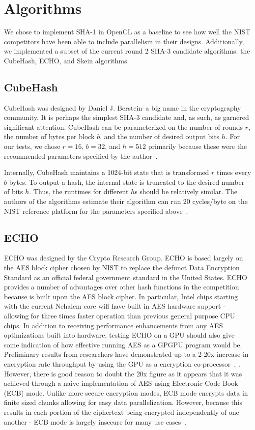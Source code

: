 \section*{Algorithms}
We chose to implement SHA-1 in OpenCL as a baseline to see how well the NIST competitors have been able to include parallelism in their designs.
Additionally, we implemented a subset of the current round 2 SHA-3 candidate algorithms: the CubeHash, ECHO, and Skein algorithms.

\subsection*{CubeHash}

CubeHash was designed by Daniel J. Berstein--a big name in the cryptography community.
It is perhaps the simplest SHA-3 candidate and, as such, as garnered significant attention.
CubeHash can be parameterized on the number of rounds $r$, the number of bytes per block $b$, and the number of desired output bits $h$.
For our tests, we chose $r=16$, $b=32$, and $h=512$ primarily because these were the recommended parameters specified by the author~\cite{CubeHash-spec}.

Internally, CubeHash maintains a 1024-bit state that is transformed $r$ times every $b$ bytes.
To output a hash, the internal state is truncated to the desired number of bits $h$.
Thus, the runtimes for different $h$s should be relatively similar.
The authors of the algorithms estimate their algorithm can run 20 cycles/byte on the NIST reference platform for the parameters specified above~\cite{Bernstein}.

\subsection*{ECHO}
ECHO was designed by the Crypto Research Group.
ECHO is based largely on the AES block cipher chosen by NIST to replace the defunct Data Encryption Standard as an official federal government standard in the United States.
ECHO provides a number of advantages over other hash functions in the competition because is built upon the AES block cipher.
In particular, Intel chips starting with the current Nehalem core will have built in AES hardware support - allowing for three times faster operation than previous general purpose CPU chips.\cite{Westmere}
In addition to receiving performance enhancements from any AES optimizations built into hardware, testing ECHO on a GPU should also give some indication of how effective running AES as a GPGPU program would be.
Preliminary results from researchers have demonstrated up to a 2-20x increase in encryption rate throughput by using the GPU as a encryption co-processor~\cite{Harrison}, \cite{Manavski}.
However, there is good reason to doubt the 20x figure as it appears that it was achieved through a naive implementation of AES using Electronic Code Book (ECB) mode.
Unlike more secure encryption modes, ECB mode encrypts data in finite sized chunks allowing for easy data parallelization.  
However, because this results in each portion of the ciphertext being encrypted independently of one another - ECB mode is largely insecure for many use cases~\cite{CodeBook}.

